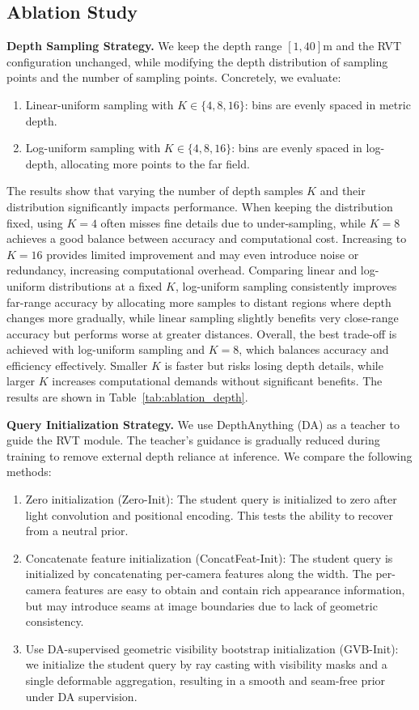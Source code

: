 \documentclass[journal]{IEEEtran}
\begin{document}
 

\subsection{Ablation Study}
\label{sec:ablation}


\textbf{Depth Sampling Strategy.}
We keep the depth range \([1,40]\)m and the RVT configuration unchanged, while modifying the depth distribution of sampling points and the number of sampling points. Concretely, we evaluate:
\begin{enumerate}
  \item Linear-uniform sampling with \(K\in\{4,8,16\}\): bins are evenly spaced in metric depth.
  \item Log-uniform sampling with \(K\in\{4,8,16\}\): bins are evenly spaced in log-depth, allocating more points to the far field.
\end{enumerate}

The results show that varying the number of depth samples \(K\) and their distribution significantly impacts performance. When keeping the distribution fixed, using \(K=4\) often misses fine details due to under-sampling, while \(K=8\) achieves a good balance between accuracy and computational cost. Increasing to \(K=16\) provides limited improvement and may even introduce noise or redundancy, increasing computational overhead. Comparing linear and log-uniform distributions at a fixed \(K\), log-uniform sampling consistently improves far-range accuracy by allocating more samples to distant regions where depth changes more gradually, while linear sampling slightly benefits very close-range accuracy but performs worse at greater distances. Overall, the best trade-off is achieved with log-uniform sampling and \(K=8\), which balances accuracy and efficiency effectively. Smaller \(K\) is faster but risks losing depth details, while larger \(K\) increases computational demands without significant benefits. The results are shown in Table~\ref{tab:ablation_depth}.


\textbf{Query Initialization Strategy.}
We use DepthAnything (DA) as a teacher to guide the RVT module. The teacher's guidance is gradually reduced during training to remove external depth reliance at inference. We compare the following methods:
\begin{enumerate}
    \item Zero initialization (Zero-Init): The student query is initialized to zero after light convolution and positional encoding. This tests the ability to recover from a neutral prior.
    \item Concatenate feature initialization (ConcatFeat-Init): The student query is initialized by concatenating per-camera features along the width. The per-camera features are easy to obtain and contain rich appearance information, but may introduce seams at image boundaries due to lack of geometric consistency.
    \item Use DA-supervised geometric visibility bootstrap initialization (GVB-Init): we initialize the student query by ray casting with visibility masks and a single deformable aggregation, resulting in a smooth and seam-free prior under DA supervision.
\end{enumerate}
\end{document}

